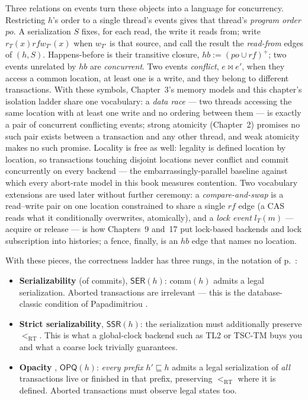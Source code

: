 Three relations on events turn these objects into a language for
concurrency. Restricting $h$'s order to a single thread's events gives that
thread's \emph{program order} $\mathit{po}$. A serialization $S$ fixes, for
each read, the write it reads from; write $r_T(x) \mathrel{\mathit{rf}}
w_{T'}(x)$ when $w_{T'}$ is that source, and call the result the
\emph{read-from} edges of $(h,S)$. Happens-before is their transitive
closure, $\mathit{hb} := (\mathit{po} \cup \mathit{rf})^+$; two events
unrelated by $\mathit{hb}$ are \emph{concurrent}. Two events
\emph{conflict}, $e \bowtie e'$, when they access a common location, at
least one is a write, and they belong to different transactions. With these
symbols, Chapter~3's memory models and this chapter's isolation ladder share
one vocabulary: a \emph{data race} --- two threads accessing the same
location with at least one write and no ordering between them --- is exactly
a pair of concurrent conflicting events; strong atomicity (Chapter~2)
promises no such pair exists between a transaction and any other thread, and
weak atomicity makes no such promise. Locality is free as well: legality is
defined location by location, so transactions touching disjoint locations
never conflict and commit concurrently on every backend --- the
embarrassingly-parallel baseline against which every abort-rate model in
this book measures contention. Two vocabulary extensions are used later
without further ceremony: a \emph{compare-and-swap} is a read--write pair on
one location constrained to share a single $\mathit{rf}$ edge (a CAS reads
what it conditionally overwrites, atomically), and a \emph{lock event}
$l_T(m)$ --- acquire or release --- is how Chapters~9 and~17 put lock-based
backends and lock subscription into histories; a fence, finally, is an
$\mathit{hb}$ edge that names no location.

With these pieces, the correctness ladder has three rungs, in the notation
of p.~\pageref{cha:notation}:

\begin{itemize}
\item \textbf{Serializability} (of commits), $\mathsf{SER}(h)$: $\mathrm{comm}(h)$ admits a legal serialization. Aborted transactions are irrelevant --- this is the database-classic condition of Papadimitriou \cite{papadimitriou79serializability}.
\item \textbf{Strict serializability}, $\mathsf{SSR}(h)$: the serialization must additionally preserve $<_\mathrm{RT}$. This is what a global-clock backend such as TL2 or TSC-TM buys you and what a coarse lock trivially guarantees.
\item \textbf{Opacity} \cite{guerraoui08correctness}, $\mathsf{OPQ}(h)$: \emph{every prefix} $h' \sqsubseteq h$ admits a legal serialization of \emph{all} transactions live or finished in that prefix, preserving $<_\mathrm{RT}$ where it is defined. Aborted transactions must observe legal states too.
\end{itemize}

